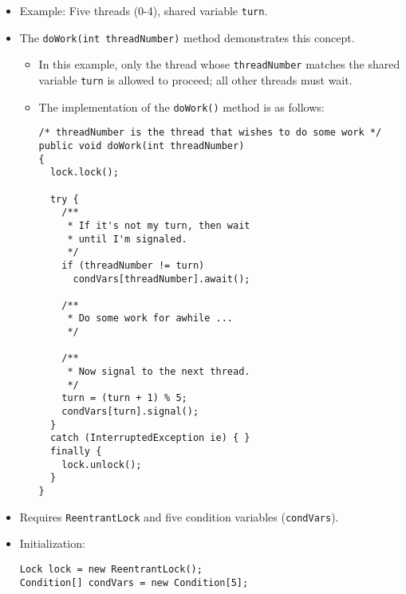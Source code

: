 \begin{itemize}
\begin{itemize}
    \end{itemize}
    \item Example: Five threads (0-4), shared variable \texttt{turn}.
    \item The \texttt{doWork(int threadNumber)} method demonstrates this concept.
    \begin{itemize}
        \item In this example, only the thread whose \texttt{threadNumber} matches the shared variable \texttt{turn} is allowed to proceed; all other threads must wait.
        \item The implementation of the \texttt{doWork()} method is as follows:
        \begin{verbatim}
/* threadNumber is the thread that wishes to do some work */
public void doWork(int threadNumber)
{
  lock.lock();
 
  try {
    /**
     * If it's not my turn, then wait
     * until I'm signaled.
     */
    if (threadNumber != turn)
      condVars[threadNumber].await();
 
    /**
     * Do some work for awhile ...
     */
 
    /**
     * Now signal to the next thread.
     */
    turn = (turn + 1) % 5;
    condVars[turn].signal();
  }
  catch (InterruptedException ie) { }
  finally {
    lock.unlock();
  }
}
        \end{verbatim}
    \end{itemize}
    \item Requires \texttt{ReentrantLock} and five condition variables (\texttt{condVars}).
    \item Initialization:
    \begin{verbatim}
Lock lock = new ReentrantLock();
Condition[] condVars = new Condition[5];
 

\end{verbatim}
\end{itemize}
